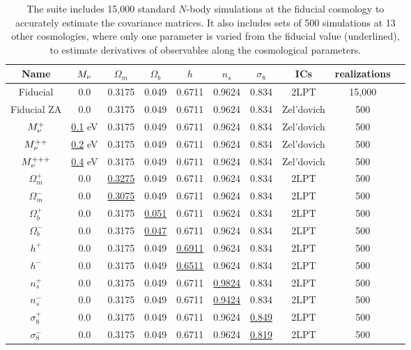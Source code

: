 \begin{table}
\caption{
The \quij suite includes 15,000 standard $N$-body simulations at the fiducial cosmology to 
accurately estimate the covariance matrices. It also includes sets of 500 simulations at 13 
other cosmologies, where only one parameter is varied from the fiducial value (underlined), 
to estimate derivatives of observables along the cosmological parameters.
} 
\begin{center}
\begin{tabular}{cccccccccc} \toprule
Name  &$M_\nu$ & $\Omega_m$ & $\Omega_b$ & $h$ & $n_s$ & $\sigma_8$ & ICs & realizations \\[3pt] \hline\hline
Fiducial 	& 0.0         & 0.3175 & 0.049 & 0.6711 & 0.9624 & 0.834 & 2LPT & 15,000 \\ 
Fiducial ZA     & 0.0         & 0.3175 & 0.049 & 0.6711 & 0.9624 & 0.834 & Zel'dovich& 500 \\ 
$M_\nu^+$       & \underline{0.1} eV & 0.3175 & 0.049 & 0.6711 & 0.9624 & 0.834 & Zel'dovich & 500 \\ 
$M_\nu^{++}$    & \underline{0.2} eV & 0.3175 & 0.049 & 0.6711 & 0.9624 & 0.834 & Zel'dovich & 500 \\ 
$M_\nu^{+++}$   & \underline{0.4} eV & 0.3175 & 0.049 & 0.6711 & 0.9624 & 0.834 & Zel'dovich & 500 \\ 
$\Omega_m^+$    & 0.0   & \underline{ 0.3275} & 0.049 & 0.6711 & 0.9624 & 0.834 & 2LPT & 500 \\ 
$\Omega_m^-$    & 0.0   & \underline{ 0.3075} & 0.049 & 0.6711 & 0.9624 & 0.834 & 2LPT & 500 \\ 
$\Omega_b^+$    & 0.0   & 0.3175 & \underline{0.051} & 0.6711 & 0.9624 & 0.834 & 2LPT & 500 \\ 
$\Omega_b^-$    & 0.0   & 0.3175 & \underline{0.047} & 0.6711 & 0.9624 & 0.834 & 2LPT & 500 \\ 
$h^+$           & 0.0   & 0.3175 & 0.049 & \underline{0.6911} & 0.9624 & 0.834 & 2LPT & 500 \\ 
$h^-$           & 0.0   & 0.3175 & 0.049 & \underline{0.6511} & 0.9624 & 0.834 & 2LPT & 500 \\ 
$n_s^+$         & 0.0   & 0.3175 & 0.049 & 0.6711 & \underline{0.9824} & 0.834 & 2LPT & 500 \\ 
$n_s^-$         & 0.0   & 0.3175 & 0.049 & 0.6711 & \underline{0.9424} & 0.834 & 2LPT & 500 \\ 
$\sigma_8^+$    & 0.0   & 0.3175 & 0.049 & 0.6711 & 0.9624 & \underline{0.849} & 2LPT & 500 \\ 
$\sigma_8^-$    & 0.0   & 0.3175 & 0.049 & 0.6711 & 0.9624 & \underline{0.819} & 2LPT & 500 \\[3pt]
\hline
\end{tabular} \label{tab:sims}
\end{center}
\end{table}
